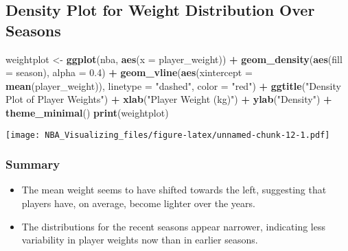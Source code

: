 \documentclass[
]{book}
\newenvironment{Shaded}{\begin{snugshade}}{\end{snugshade}}
\newcommand{\AttributeTok}[1]{\textcolor[rgb]{0.13,0.29,0.53}{#1}}
\newcommand{\FloatTok}[1]{\textcolor[rgb]{0.00,0.00,0.81}{#1}}
\newcommand{\FunctionTok}[1]{\textcolor[rgb]{0.13,0.29,0.53}{\textbf{#1}}}
\newcommand{\NormalTok}[1]{#1}
\newcommand{\OtherTok}[1]{\textcolor[rgb]{0.56,0.35,0.01}{#1}}
\newcommand{\SpecialCharTok}[1]{\textcolor[rgb]{0.81,0.36,0.00}{\textbf{#1}}}
\newcommand{\StringTok}[1]{\textcolor[rgb]{0.31,0.60,0.02}{#1}}
\providecommand{\tightlist}{%
  \setlength{\itemsep}{0pt}\setlength{\parskip}{0pt}}
\begin{document}
\hypertarget{density-plot-for-weight-distribution-over-seasons}{%
\subsection{Density Plot for Weight Distribution Over Seasons}\label{density-plot-for-weight-distribution-over-seasons}}

\begin{Shaded}
\begin{Highlighting}[]
\NormalTok{weightplot }\OtherTok{\textless{}{-}} \FunctionTok{ggplot}\NormalTok{(nba, }\FunctionTok{aes}\NormalTok{(}\AttributeTok{x =}\NormalTok{ player\_weight)) }\SpecialCharTok{+}
    \FunctionTok{geom\_density}\NormalTok{(}\FunctionTok{aes}\NormalTok{(}\AttributeTok{fill =}\NormalTok{ season), }\AttributeTok{alpha =} \FloatTok{0.4}\NormalTok{) }\SpecialCharTok{+}
    \FunctionTok{geom\_vline}\NormalTok{(}\FunctionTok{aes}\NormalTok{(}\AttributeTok{xintercept =} \FunctionTok{mean}\NormalTok{(player\_weight)),}
        \AttributeTok{linetype =} \StringTok{"dashed"}\NormalTok{, }\AttributeTok{color =} \StringTok{"red"}\NormalTok{) }\SpecialCharTok{+}
    \FunctionTok{ggtitle}\NormalTok{(}\StringTok{"Density Plot of Player Weights"}\NormalTok{) }\SpecialCharTok{+}
    \FunctionTok{xlab}\NormalTok{(}\StringTok{"Player Weight (kg)"}\NormalTok{) }\SpecialCharTok{+} \FunctionTok{ylab}\NormalTok{(}\StringTok{"Density"}\NormalTok{) }\SpecialCharTok{+}
    \FunctionTok{theme\_minimal}\NormalTok{()}
\FunctionTok{print}\NormalTok{(weightplot)}
\end{Highlighting}
\end{Shaded}

\texttt{[image: NBA\_Visualizing\_files/figure-latex/unnamed-chunk-12-1.pdf]}

\hypertarget{summary-1}{%
\subsubsection{Summary}\label{summary-1}}

\begin{itemize}
\tightlist
\item
  The mean weight seems to have shifted towards the left, suggesting that players have, on average, become lighter over the years.
\item
  The distributions for the recent seasons appear narrower, indicating less variability in player weights now than in earlier seasons.
\end{itemize}
\end{document}

